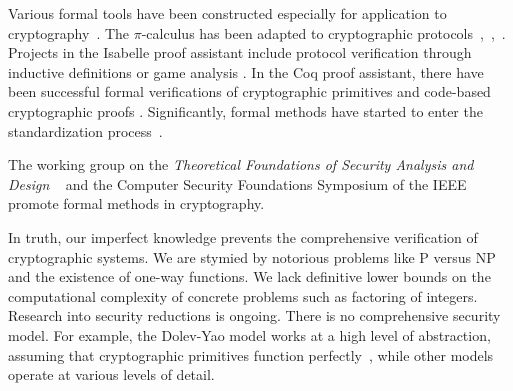 \documentclass[11pt]{amsart} %
\begin{document}
Various formal tools have been constructed especially for application to cryptography~\cite{MPRI-Notes}.
The $\pi$-calculus 
has been adapted to cryptographic protocols~\cite{AF},~\cite{SPI},~\cite{RM99}.
Projects in the Isabelle proof assistant
include protocol verification through inductive definitions \cite{Pau-ind} or game analysis \cite{Berg-thesis}. In the Coq proof assistant,
there have been successful 
formal verifications of cryptographic primitives \cite{Nowak} and code-based cryptographic proofs \cite{Barthe-2009}.
Significantly, formal methods have started to enter the standardization process~\cite{Meadows}.



The working group on the {\it Theoretical Foundations of Security
Analysis and Design}
~\cite{TFSAD}
and the Computer Security Foundations Symposium of the IEEE~\cite{CSF2013} promote formal methods in cryptography.

In truth, our imperfect knowledge prevents the
comprehensive verification of cryptographic systems.
We are stymied by notorious problems like
P versus NP  and the existence of one-way functions.  
We lack definitive lower bounds on the computational complexity of concrete problems such as
factoring of integers.
Research into security reductions is ongoing.  
There is no comprehensive security model.  
For example, the Dolev-Yao model works at a high level of abstraction, assuming that cryptographic primitives function perfectly~\cite{DY},
while other models operate at various levels of detail.
\end{document}
